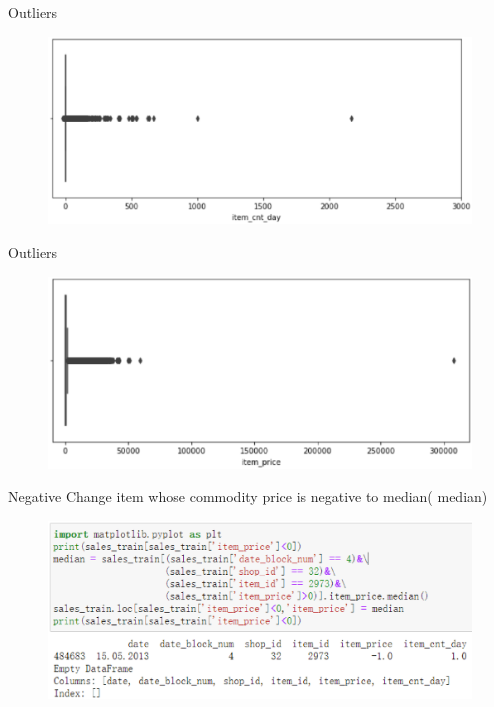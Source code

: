 \documentclass[
 size=14pt,
 paper=smartboard,  %
 mode=present, 		%
 display=slides, 	%
 style=tuliplab,  	%
 pauseslide,
 fleqn,leqno]{powerdot}
\begin{document}
\begin{slide}[toc=,bm=]{Outliers}
  \begin{figure}
    \includegraphics[scale=0.5]{picture/data_7.eps}
  \end{figure}
\end{slide}

\begin{slide}[toc=,bm=]{Outliers}
  \begin{figure}
    \includegraphics[scale=0.5]{picture/data_8.eps}
  \end{figure}
\end{slide}

\begin{slide}[toc=,bm=]{Negative}
  Change item whose commodity price is negative to median( median)
  \begin{figure}
    \includegraphics[scale=0.5]{picture/data_9.eps}
  \end{figure}
\end{slide}
\end{document}
